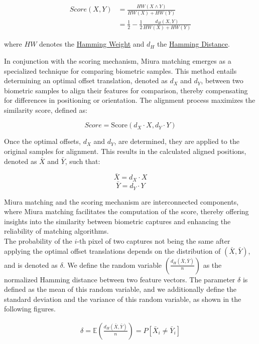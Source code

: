 \begin{equation} \label{eq:score}
    \begin{aligned}
        Score(X, Y) &= \frac{HW(X \land Y)}{HW(X) + HW(Y)}\\
        &= \frac{1}{2}-\frac{1}{2}\frac{d_H(X, Y)}{HW(X) + HW(Y)}
    \end{aligned}
\end{equation}

where \(HW\) denotes the \hyperref[def:Hamming Weight]{Hamming Weight} and \(d_H\) the \hyperref[def:Hamming Distance]{Hamming Distance}. 

In conjunction with the scoring mechanism, Miura matching emerges as a specialized technique for comparing biometric samples. This method entails determining an optimal offset translation, denoted as \(d_X\) and \(d_Y\), between two biometric samples to align their features for comparison, thereby compensating for differences in positioning or orientation. The alignment process maximizes the similarity score, defined as:

\[Score = \text{Score}(d_X \cdot X, d_Y \cdot Y)\]

Once the optimal offsets, \(d_X\) and \(d_Y\), are determined, they are applied to the original samples for alignment. This results in the calculated aligned positions, denoted as \(\bar{X}\) and \(\bar{Y}\), such that:

\[\bar{X} = d_X \cdot X\]
\[\bar{Y} = d_Y \cdot Y\]

Miura matching and the scoring mechanism are interconnected components, where Miura matching facilitates the computation of the score, thereby offering insights into the similarity between biometric captures and enhancing the reliability of matching algorithms.\\

The probability of the \(i\)-th pixel of two captures not being the same after applying the optimal offset translations depends on the distribution of \((\bar{X}, \bar{Y})\), and is denoted as \(\delta\). We define the random variable \(\left( \frac{d_H(\bar{X}, \bar{Y})}{n} \right)\) as the normalized Hamming distance between two feature vectors. The parameter \(\delta\) is defined as the mean of this random variable, and we additionally define the standard deviation and the variance of this random variable, as shown in the following figures.



\begin{equation} \label{eq:delta}
    \begin{aligned}
        \delta = \mathbb{E}\left( \frac{d_H(\bar{X}, \bar{Y})}{n} \right) = P[\bar{X}_i \neq \bar{Y}_i]
    \end{aligned}
\end{equation}

